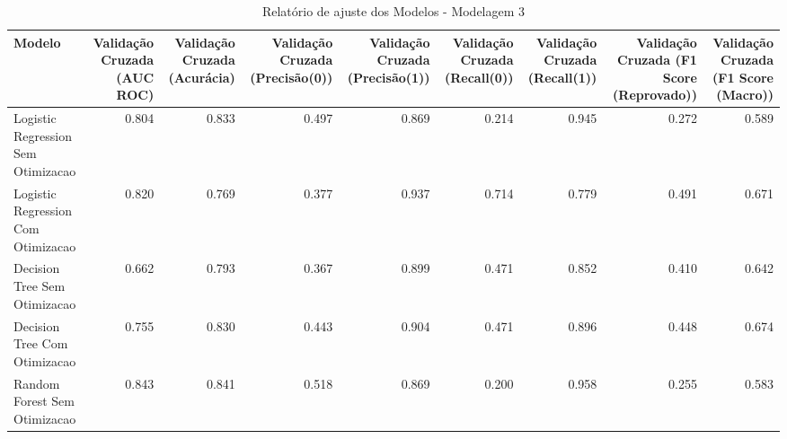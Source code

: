 \begin{table}[H] %
    \centering
    \caption{Relatório de ajuste dos Modelos - Modelagem 3}
    \label{tab:relatorio_ajuste_modelagem_3}
    \renewcommand{\arraystretch}{1.25} %
    \begin{adjustwidth}{ -1in }{ -1in } %
    \centering %
    \small %
    \begin{tabular}{lrrrrrrrr}
\toprule
                            Modelo &  Validação Cruzada (AUC ROC) &  Validação Cruzada (Acurácia) &  Validação Cruzada (Precisão(0)) &  Validação Cruzada (Precisão(1)) &  Validação Cruzada (Recall(0)) &  Validação Cruzada (Recall(1)) &  Validação Cruzada (F1 Score (Reprovado)) &  Validação Cruzada (F1 Score (Macro)) \\
\midrule
Logistic Regression Sem Otimizacao &                        0.804 &                         0.833 &                            0.497 &                            0.869 &                          0.214 &                          0.945 &                                     0.272 &                                 0.589 \\
Logistic Regression Com Otimizacao &                        0.820 &                         0.769 &                            0.377 &                            0.937 &                          0.714 &                          0.779 &                                     0.491 &                                 0.671 \\
      Decision Tree Sem Otimizacao &                        0.662 &                         0.793 &                            0.367 &                            0.899 &                          0.471 &                          0.852 &                                     0.410 &                                 0.642 \\
      Decision Tree Com Otimizacao &                        0.755 &                         0.830 &                            0.443 &                            0.904 &                          0.471 &                          0.896 &                                     0.448 &                                 0.674 \\
      Random Forest Sem Otimizacao &                        0.843 &                         0.841 &                            0.518 &                            0.869 &                          0.200 &                          0.958 &                                     0.255 &                                 0.583 \\

\end{tabular}
\end{adjustwidth}
\end{table}
